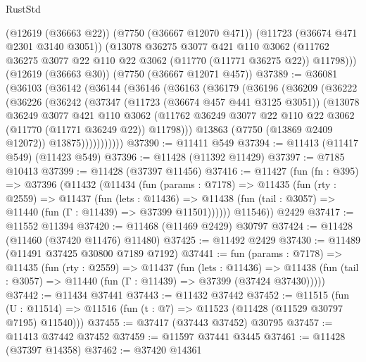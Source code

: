 \begin{lexlean}{RustStd}
\begin{coremodule}
      (@12619 (@36663 @22))
      (@7750 (@36667 @12070 @471))
      (@11723 (@36674 @471 @2301 @3140 @3051))
      (@13078
        @36275
        @3077
        @421
        @110
        @3062
        (@11762 @36275 @3077 @22 @110 @22 @3062 (@11770 (@11771 @36275 @22)) @11798)))
    (@12619 (@36663 @30))
    (@7750 (@36667 @12071 @457))
@37389 := @36081
    (@36103
      (@36142
        (@36144
          (@36146
            (@36163
              (@36179
                (@36196
                  (@36209
                    (@36222
                      (@36226
                        (@36242
                          (@37347
                            (@11723 (@36674 @457 @441 @3125 @3051))
                            (@13078
                              @36249
                              @3077
                              @421
                              @110
                              @3062
                              (@11762
                                @36249
                                @3077
                                @22
                                @110
                                @22
                                @3062
                                (@11770 (@11771 @36249 @22))
                                @11798)))
                          @13863
                          (@7750 (@13869 @2409 @12072))
                          @13875)))))))))))
@37390 := @11411 @549
@37394 := @11413 (@11417 @549) (@11423 @549)
@37396 := @11428 (@11392 @11429)
@37397 := @7185 @10413
@37399 := @11428 (@37397 @11456)
@37416 := @11427
    (fun (fn : @395) =>
    @37396
      (@11432
        (@11434
          (fun (params : @7178) =>
          @11435
            (fun (rty : @2559) =>
            @11437
              (fun (lets : @11436) =>
              @11438 (fun (tail : @3057) => @11440 (fun (Γ : @11439) => @37399 @11501))))))
        @11546))
    @2429
@37417 := @11552 @11394
@37420 := @11468 (@11469 @2429) @30797
@37424 := @11428 (@11460 (@37420 @11476) @11480)
@37425 := @11492 @2429
@37430 := @11489 (@11491 @37425 @30800 @7189 @7192)
@37441 := fun (params : @7178) =>
  @11435
    (fun (rty : @2559) =>
    @11437
      (fun (lets : @11436) =>
      @11438 (fun (tail : @3057) => @11440 (fun (Γ : @11439) => @37399 (@37424 @37430)))))
@37442 := @11434 @37441
@37443 := @11432 @37442
@37452 := @11515
    (fun (U : @11514) => @11516 (fun (t : @7) => @11523 (@11428 (@11529 @30797 @7195) @11540)))
@37455 := @37417 (@37443 @37452) @30795
@37457 := @11413 @37442 @37452
@37459 := @11597 @37441 @3445
@37461 := @11428 (@37397 @14358)
@37462 := @37420 @14361

\end{coremodule}
\end{lexlean}
